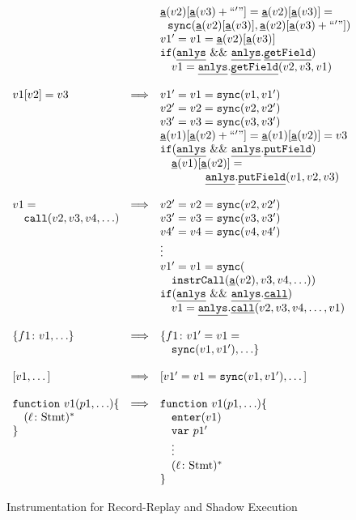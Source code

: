 \documentclass{sig-alternate}
\newcommand \dsl [1] {\ensuremath{{\tt #1}}\xspace}
\newcommand \usl [1] {\mbox{\underline{\tt #1}}\xspace}
\newcommand \Sync{\dsl{sync}}
\newcommand \Actual{\usl{a}}
\newcommand \Enter{\dsl{enter}}
\newcommand \analysis{\usl{anlys}}
\begin{document}
\begin{figure}
{\[\begin{array}{lrl}
& & \Actual(v2)[\Actual(v3)+``'"] = \Actual(v2)[\Actual(v3)] = \\
& & \ \ \Sync(\Actual(v2)[\Actual(v3)], \Actual(v2)[\Actual(v3)+``'"])\\
& & v1' = v1 = \Actual(v2)[\Actual(v3)]\\
& & \dsl{if} (\analysis \ \&\&\  \analysis.\usl{getField})\\
& & \quad v1 = \analysis.\usl{getField}(v2, v3, v1)\\
& & \\
    v1[v2] = v3 & \Longrightarrow & v1' = v1 = \Sync(v1, v1')\\
& & v2' = v2 = \Sync(v2, v2')\\
& & v3' = v3 = \Sync(v3, v3')\\
& & \Actual(v1)[\Actual(v2)+``'"] = \Actual(v1)[\Actual(v2)] = v3\\
& & \dsl{if} (\analysis \ \&\&\  \analysis.\usl{putField})\\
& & \quad \Actual(v1)[\Actual(v2)] = \\
& & \qquad\qquad \analysis.\usl{putField}(v1, v2, v3)\\
& & \\
    v1=& \Longrightarrow & v2' = v2 =
    \Sync(v2, v2')\\
\quad \dsl{call}(v2, v3, v4, \ldots) & & v3' = v3 = \Sync(v3, v3')\\
& & v4' = v4 = \Sync(v4, v4')\\
& & \vdots \\
& & v1' = v1 = \Sync(\\
& & \quad\dsl{instrCall}(\Actual(v2), v3, v4, \ldots))\\
& & \dsl{if} (\analysis \ \&\&\  \analysis.\usl{call})\\
& & \quad v1 = \analysis.\usl{call}(v2, v3, v4, \ldots, v1)\\
& & \\
  \{f1\colon v1, \ldots\} & \Longrightarrow &\{f1\colon v1' = v1 =\\
& &\quad  \Sync(v1, v1'), \ldots\} \\
& & \\
  \mbox{[}v1, \ldots\mbox{]} & \Longrightarrow & \mbox{[}v1' = v1 =
  \Sync(v1, v1'), \ldots\mbox{]} \\
& & \\
    \dsl{function}\ v1(p1, \ldots) \{ & \Longrightarrow &  \dsl{function}\ v1 (p1, \ldots) \{\\
\quad (\ell\colon \mbox{Stmt})^* & & \quad \Enter(v1)\\
\} & & \quad \dsl{var}\ p1'\\
& & \quad \vdots\\
& & \quad  (\ell\colon \mbox{Stmt})^*\\
& & \}\\
\end{array}
\]}
\caption{Instrumentation for Record-Replay and Shadow Execution}
\label{fig:instr3}
\end{figure}
\end{document}
